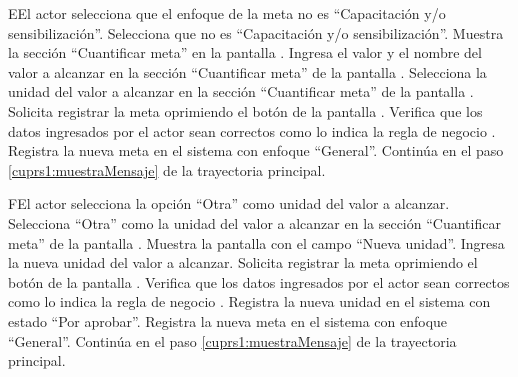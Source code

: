 \begin{UCtrayectoriaA}{E}{El actor selecciona que el enfoque de la meta no es ``Capacitación y/o sensibilización''.}
	\UCpaso[\UCactor] Selecciona que  no es ``Capacitación y/o sensibilización''. 
	\UCpaso[\UCsist] Muestra la sección ``Cuantificar meta'' en la pantalla .
	\UCpaso[\UCactor] Ingresa el valor y el nombre del valor a alcanzar en la sección ``Cuantificar meta'' de la pantalla .
	\UCpaso[\UCactor] Selecciona la unidad del valor a alcanzar en la sección ``Cuantificar meta'' de la pantalla . 
	\UCpaso[\UCactor] Solicita registrar la meta oprimiendo el botón  de la pantalla .  
	\UCpaso[\UCsist] Verifica que los datos ingresados por el actor sean correctos como lo indica la regla de negocio .   
	\UCpaso[\UCsist] Registra la nueva meta en el sistema con enfoque ``General''.
	\UCpaso[] Continúa en el paso \ref{cuprs1:muestraMensaje} de la trayectoria principal.
\end{UCtrayectoriaA}

\begin{UCtrayectoriaA}{F}{El actor selecciona la opción ``Otra'' como unidad del valor a alcanzar.}
	\UCpaso[\UCactor] Selecciona ``Otra'' como la unidad del valor a alcanzar en la sección ``Cuantificar meta'' de la pantalla .
	\UCpaso[\UCsist] Muestra la pantalla   con el campo ``Nueva unidad''.
	\UCpaso[\UCactor] Ingresa la nueva unidad del valor a alcanzar.
	\UCpaso[\UCactor] Solicita registrar la meta oprimiendo el botón  de la pantalla .  
	\UCpaso[\UCsist] Verifica que los datos ingresados por el actor sean correctos como lo indica la regla de negocio .   
	\UCpaso[\UCsist] Registra la nueva unidad en el sistema con estado ``Por aprobar''.
	\UCpaso[\UCsist] Registra la nueva meta en el sistema con enfoque ``General''.
	\UCpaso[] Continúa en el paso \ref{cuprs1:muestraMensaje} de la trayectoria principal.
\end{UCtrayectoriaA} 


